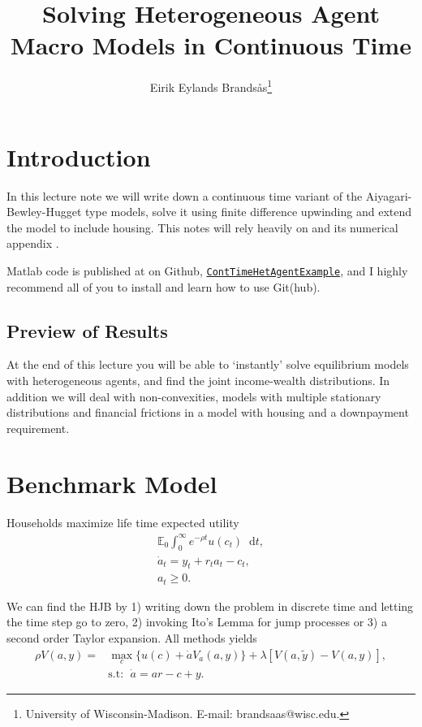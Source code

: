 \documentclass[12pt]{article}
\title{\vspace{-7ex}Solving Heterogeneous Agent Macro Models in Continuous Time}
\author{Eirik Eylands Brands\aa s\thanks{University  of  Wisconsin-Madison.  E-mail: brandsaas@wisc.edu. }}
\newcommand{\E}{\mathbb{E}}
\DeclareMathOperator{\1}{\mathbbm{1}}
\newcommand*\diff{\mathop{}\!\mathrm{d}}
\begin{document}
\maketitle

\section{Introduction}
In this lecture note we will write down a continuous time variant of the Aiyagari-Bewley-Hugget type models, solve it using finite difference upwinding and extend the model to include housing. This notes will rely heavily on \cite{Achdou2017} and its numerical appendix \cite{Achdou2017a}.

Matlab code is published at on Github, \href{https://github.com/eirikeb/ContTimeHetAgentExample/}{\texttt{ContTimeHetAgentExample}}, and I highly recommend all of you to install and learn how to use Git(hub).

\subsection{Preview of Results}
At the end of this lecture you will be able to `instantly' solve equilibrium models with heterogeneous agents, and find the joint income-wealth distributions. In addition we will deal with non-convexities, models with multiple stationary distributions and financial frictions in a model with housing and a downpayment requirement.




\section{Benchmark Model}
Households maximize life time expected utility
\begin{align}
\E_0 \int_0^\infty e^{-\rho t} u(c_t) \diff t, \\
\dot a_t = y_t + r_t a_t - c_t, \\
a_t\ge 0.
\end{align}

We can find the HJB by 1) writing down the problem in discrete time and letting the time step go to zero, 2) invoking Ito's Lemma for jump processes or 3) a second order Taylor expansion. All methods yields
\begin{align}\label{eq:HJB}
\rho V(a,y) =& \max_{c} \big\{ u(c) + \dot a V_a(a,y) \big\} + \lambda [V(a,\tilde y) - V(a,y)],\\
&\text{s.t: }\; \dot a = a r - c + y.
\end{align}
\end{document}

